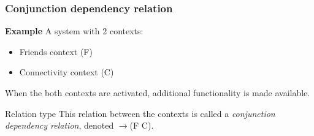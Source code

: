 \begin{frame}[noframenumbering]
	\frametitle{Conjunction dependency relation}

	\textbf{Example} A system with 2 contexts:

	\begin{itemize}
		\item Friends context (F)
		\item Connectivity context (C)
	\end{itemize}

	When the both contexts are activated, additional functionality is made
	available.

	\begin{exampleblock}{Relation type}
		This relation between the contexts is called a \textit{conjunction
		dependency relation}, denoted $\rightarrow$(F C).
	\end{exampleblock}
\end{frame}
